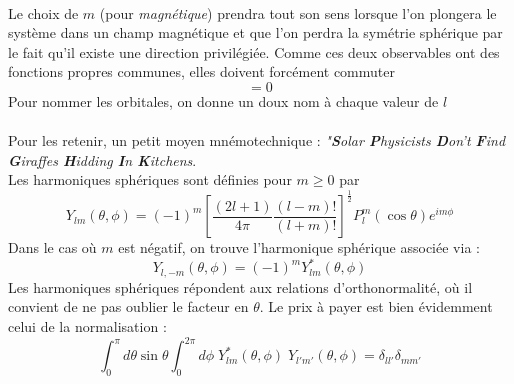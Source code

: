 \ \\

Le choix de $m$ (pour \textit{magnétique}) prendra tout son sens lorsque l'on plongera le système dans un 
champ magnétique et que l'on perdra la symétrie sphérique par le fait qu'il existe une direction privilégiée. 
Comme ces deux observables ont des fonctions propres communes, elles doivent forcément commuter
\begin{equation}
[\vec{L}^2, L_z] = 0
\end{equation}
Pour nommer les orbitales, on donne un doux nom à chaque valeur de $l$\\

\ \\

Pour les retenir, un petit moyen mnémotechnique : \textit{"\textbf{S}olar \textbf{P}hysicists \textbf{D}on't
\textbf{F}ind \textbf{G}iraffes \textbf{H}idding \textbf{I}n \textbf{K}itchens}.\\

Les harmoniques sphériques sont définies pour $m \geq 0$ par 
\begin{equation}
Y_{lm} (\theta, \phi) = (-1)^m
\left[ \frac{(2l+1)}{4 \pi} \frac{(l-m)!}{(l+m)!}
\right] ^{\frac{1}{2}}  P^{m}_l (\cos \theta) e^{i m \phi}
\end{equation}
Dans le cas où $m$ est négatif, on trouve l'harmonique sphérique associée via : 
\begin{equation}
Y_{l,-m} (\theta, \phi) = (-1)^m Y^\ast_{lm} (\theta, \phi)
\end{equation}
Les harmoniques sphériques répondent aux relations d'orthonormalité, où il convient de ne pas oublier le 
facteur en $\theta$. Le prix à payer est bien évidemment celui de la normalisation :
\begin{equation}
\int_0^\pi d \theta \sin \theta 
\int_0^{2 \pi} d\phi \; Y_{lm}^\ast (\theta,\phi) \; 
Y_{l'm'} (\theta,\phi) = \delta_{ll'} \delta_{mm'}
\end{equation}

